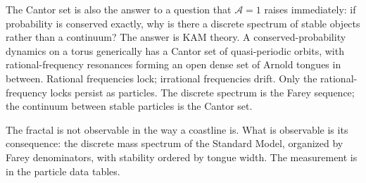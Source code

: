 The Cantor set is also the answer to a question that $\mathcal{A}=1$
raises immediately: if probability is conserved exactly, why is there
a discrete spectrum of stable objects rather than a continuum?
The answer is KAM theory.
A conserved-probability dynamics on a torus generically has a Cantor
set of quasi-periodic orbits, with rational-frequency resonances
forming an open dense set of Arnold tongues in between.
Rational frequencies lock; irrational frequencies drift.
Only the rational-frequency locks persist as particles.
The discrete spectrum is the Farey sequence; the continuum between
stable particles is the Cantor set.

The fractal is not observable in the way a coastline is.
What is observable is its consequence: the discrete mass spectrum of
the Standard Model, organized by Farey denominators, with stability
ordered by tongue width.
The measurement is in the particle data tables.